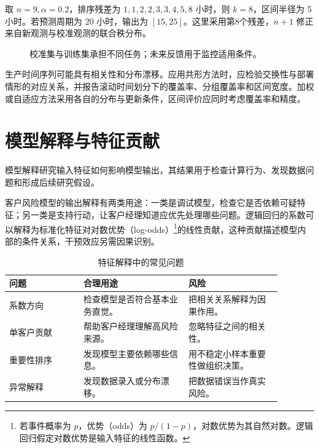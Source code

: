 \begin{example}[有限样本分位数]
取 \(n=9,\alpha=0.2\)，排序残差为
\(1,1,2,2,3,3,4,5,8\) 小时，则 \(k=8\)，区间半径为 5 小时。若预测周期为 20 小时，输出为 \([15,25]\)。这里采用第8个残差，\(n+1\) 修正来自新观测与校准观测的联合秩分布。
\end{example}

\begin{figure}[htbp]
\centering
{}
\caption{校准集与训练集承担不同任务；未来反馈用于监控适用条件。}
\end{figure}

生产时间序列可能具有相关性和分布漂移。应用共形方法时，应检验交换性与部署情形的对应关系，并报告滚动时间划分下的覆盖率、分组覆盖率和区间宽度。加权或自适应方法采用各自的分布与更新条件，区间评价应同时考虑覆盖率和精度。

\section{模型解释与特征贡献}

模型解释研究输入特征如何影响模型输出，其结果用于检查计算行为、发现数据问题和形成后续研究假设。

客户风险模型的输出解释有两类用途：一类是调试模型，检查它是否依赖可疑特征；另一类是支持行动，让客户经理知道应优先处理哪些问题。逻辑回归的系数可以解释为标准化特征对对数优势（log-odds）\footnote{若事件概率为 \(p\)，优势（odds）为 \(p/(1-p)\)，对数优势为其自然对数。逻辑回归假定对数优势是输入特征的线性函数。}的线性贡献，这种贡献描述模型内部的条件关系，干预效应另需因果识别。

\begin{table}[htbp]
\centering
\caption{特征解释中的常见问题}
\begin{tabular}{P{0.24\linewidth}P{0.34\linewidth}P{0.30\linewidth}}
\toprule
{}
问题 & 合理用途 & 风险\\
\midrule

系数方向 & 检查模型是否符合基本业务直觉。 & 把相关关系解释为因果作用。\\
单客户贡献 & 帮助客户经理理解高风险来源。 & 忽略特征之间的相关性。\\
重要性排序 & 发现模型主要依赖哪些信息。 & 用不稳定小样本重要性做组织决策。\\
异常解释 & 发现数据录入或分布漂移。 & 把数据错误当作真实风险。\\
\bottomrule
\end{tabular}
\end{table}

